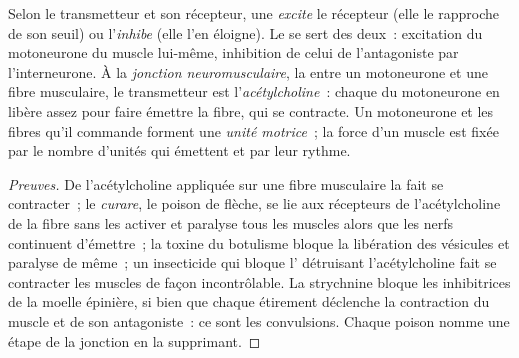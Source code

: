 \begin{proposition}\label{prop:g12:stretch-reflex:junction}
Selon le transmetteur et son récepteur, une  \emph{excite} le
 récepteur (elle le rapproche de son seuil) ou l'\emph{inhibe}
(elle l'en éloigne). Le  se sert des deux~:
excitation du motoneurone du muscle lui-même, inhibition de celui de
l'antagoniste par l'interneurone. À la \emph{jonction
neuromusculaire}, la  entre un motoneurone et une fibre
musculaire, le transmetteur est l'\emph{acétylcholine}~: chaque
 du motoneurone en libère assez pour faire émettre
la fibre, qui se contracte. Un motoneurone et les fibres qu'il commande
forment une \emph{unité motrice}~; la force d'un muscle est fixée par
le nombre d'unités qui émettent et par leur rythme.
\end{proposition}
\begin{proof}[Preuves]
De l'acétylcholine appliquée sur une fibre musculaire la fait se
contracter~; le \emph{curare}, le poison de flèche, se lie aux
récepteurs de l'acétylcholine de la fibre sans les activer et paralyse
tous les muscles alors que les nerfs continuent d'émettre~; la toxine
du botulisme bloque la libération des vésicules et paralyse de même~;
un insecticide qui bloque l' détruisant l'acétylcholine fait se
contracter les muscles de façon incontrôlable. La strychnine bloque
les  inhibitrices de la moelle épinière, si bien que chaque
étirement déclenche la contraction du muscle et de son antagoniste~:
ce sont les convulsions. Chaque poison nomme une étape de la jonction
en la supprimant.
\end{proof}

